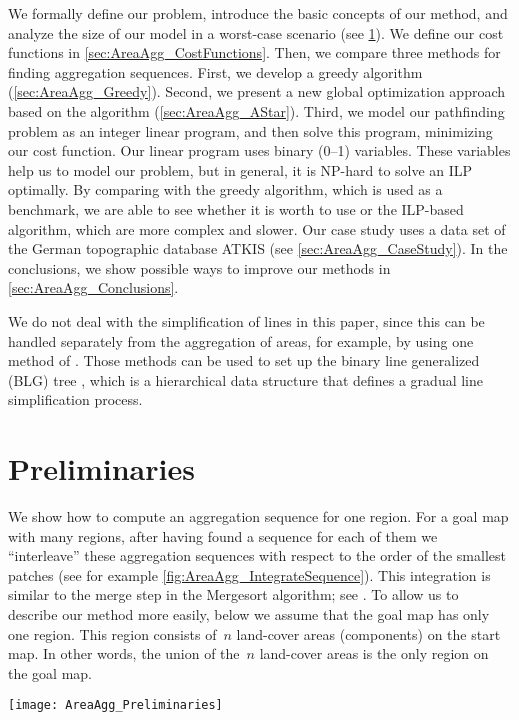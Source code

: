 We formally define our problem, 
introduce the basic concepts of our method, 
and analyze the size of our model in a worst-case scenario
(see \sect\ref{sec:AreaAgg_Preliminaries}).
We define our cost functions in 
\sect\ref{sec:AreaAgg_CostFunctions}.
Then, we compare three methods for finding aggregation sequences.
First, we develop 
a greedy algorithm (\sect\ref{sec:AreaAgg_Greedy}).
Second, we present a new global optimization approach
based on the \Astar algorithm 
(\sect\ref{sec:AreaAgg_AStar}).
Third, we model our pathfinding problem as
an integer linear program, 
and then solve this program, minimizing our cost function.
Our linear program uses binary (0--1) variables. 
These variables help us to model our problem, 
but in general, it is NP-hard to solve an ILP optimally.
By comparing with the greedy algorithm, 
which is used as a benchmark,
we are able to see whether it is worth 
to use \Astar or the ILP-based algorithm, 
which are more complex and slower.  
Our case study 
uses a data set of the German topographic database ATKIS 
(see \sect\ref{sec:AreaAgg_CaseStudy}).
In the conclusions, we show possible ways to improve our 
methods in \sect\ref{sec:AreaAgg_Conclusions}. 

We do not deal with the simplification of lines in this paper, 
since this can be handled separately from the
aggregation of areas, for example, 
by using one method of 
\textcite{Douglas1973,Saalfeld1999,Wu2004DP}.
Those methods can be used to set up 
the binary line generalized (BLG) tree
\citep{vanOosterom1995Development},
which is a hierarchical data structure that 
defines a gradual line simplification process.

\section{Preliminaries}
\label{sec:AreaAgg_Preliminaries}

We show how to compute an aggregation sequence for one region. 
For a goal map with many regions, 
after having found a sequence for each of them
we ``interleave'' these aggregation sequences
with respect to the order of the smallest patches 
(see for example \fig\ref{fig:AreaAgg_IntegrateSequence}).
This integration is similar to the merge step in the 
Mergesort algorithm; 
see \textcite[pp.~29--37]{Cormen2009}.
To allow us to describe our method more easily,
below we assume that the goal map has only one region.
This region consists of~$n$ land-cover 
areas (components) on the start map. 
In other words, the union of the~$n$ land-cover areas 
is the only region on the goal map.
\begin{figure*}[tb]
\centering
\texttt{[image: AreaAgg\_Preliminaries]}
\caption{Integrating two aggregation sequences 
	of different regions: 
	the resulting sequence contains the given sequences 
	as subsequences and 
	always takes the subdivision with smallest patch next.
	The gray arrows show the integration of the two regions.
}
\label{fig:AreaAgg_IntegrateSequence}
\end{figure*}


